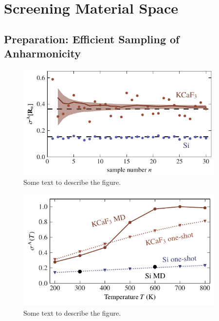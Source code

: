 %
%

\section{Screening Material Space}

\subsection{Preparation: Efficient Sampling of Anharmonicity}

\begin{figure}
	\includegraphics[width=4.1in]{./data/plots/anharmonicity/7_sampling/convergence_sigma_MC.pdf}
	\caption{
		Some text to describe the figure.
	}
\end{figure}

\begin{figure}
	\includegraphics[width=4.1in]{./data/plots/anharmonicity/7_sampling/sigma_temp_one_shot.pdf}
	\caption{
		Some text to describe the figure.
	}
\end{figure}

